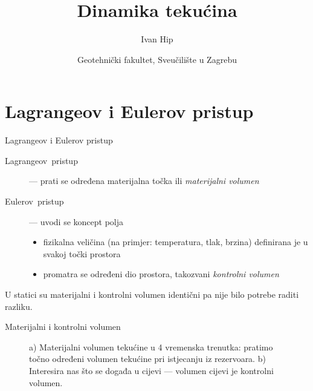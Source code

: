 \documentclass[croatian]{beamer}
\begin{document}
\title{Dinamika tekućina}
\author{Ivan Hip}
\date{Geotehnički fakultet, Sveučilište u Zagrebu}

\begin{frame}
\titlepage
\end{frame}

\section{Lagrangeov i Eulerov pristup}

\begin{frame}{Lagrangeov i Eulerov pristup}

\begin{description}
\item [{Lagrangeov~pristup}] --- prati se određena materijalna točka
ili \emph{materijalni volumen}
\item [{Eulerov~pristup}] --- uvodi se koncept polja

\begin{itemize}
\item fizikalna veličina (na primjer: temperatura, tlak, brzina) definirana
je u svakoj točki prostora
\item promatra se određeni dio prostora, takozvani \emph{kontrolni volumen}
\end{itemize}

\end{description}
U statici su materijalni i kontrolni volumen identični pa nije bilo
potrebe raditi razliku.
\end{frame}

\begin{frame}{Materijalni i kontrolni volumen}

\begin{figure}
\begin{centering}
\par\end{centering}
\caption{a) Materijalni volumen tekućine u 4 vremenska trenutka: pratimo točno
određeni volumen tekućine pri istjecanju iz rezervoara. b) Interesira
nas što se događa u cijevi --- volumen cijevi je kontrolni volumen.}
\end{figure}
\end{frame}
\end{document}
